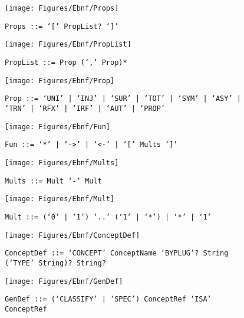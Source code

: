  \begin{figure}[H]
  \centering
  \texttt{[image: Figures/Ebnf/Props]}
  \caption*{\texttt{Props \small::=  `[' PropList? `]'}}
  \label{fig:ebnf-Props}
 \end{figure}

 \begin{figure}[H]
  \centering
  \texttt{[image: Figures/Ebnf/PropList]}
  \caption*{\texttt{PropList \small::=  Prop (`,' Prop)*}}
  \label{fig:ebnf-PropList}
 \end{figure}

 \begin{figure}[H]
  \centering
  \texttt{[image: Figures/Ebnf/Prop]}
  \caption*{\texttt{Prop \small::=  `UNI' | `INJ' | `SUR' | `TOT' | `SYM' | `ASY' | `TRN' | `RFX' | `IRF' | `AUT' | `PROP'}}
  \label{fig:ebnf-Prop}
 \end{figure}

 \begin{figure}[H]
  \centering
  \texttt{[image: Figures/Ebnf/Fun]}
  \caption*{\texttt{Fun \small::=  `*' | `->' | `<-' | `[' Mults `]'}}
  \label{fig:ebnf-Fun}
 \end{figure}

 \begin{figure}[H]
  \centering
  \texttt{[image: Figures/Ebnf/Mults]}
  \caption*{\texttt{Mults \small::=  Mult `-' Mult}}
  \label{fig:ebnf-Mults}
 \end{figure}

 \begin{figure}[H]
  \centering
  \texttt{[image: Figures/Ebnf/Mult]}
  \caption*{\texttt{Mult \small::=  (`0' | `1') `..' (`1' | `*') | `*' | `1'}}
  \label{fig:ebnf-Mult}
 \end{figure}

 \begin{figure}[H]
  \centering
  \texttt{[image: Figures/Ebnf/ConceptDef]}
  \caption*{\texttt{ConceptDef \small::=  `CONCEPT' ConceptName `BYPLUG'? String (`TYPE' String)? String?}}
  \label{fig:ebnf-ConceptDef}
 \end{figure}

 \begin{figure}[H]
  \centering
  \texttt{[image: Figures/Ebnf/GenDef]}
  \caption*{\texttt{GenDef \small::=  (`CLASSIFY' | `SPEC') ConceptRef `ISA' ConceptRef}}
  \label{fig:ebnf-GenDef}
 \end{figure}

